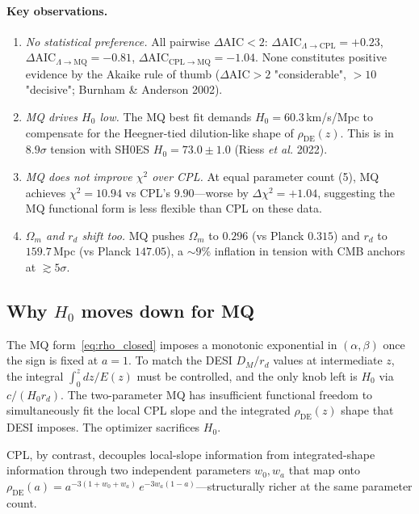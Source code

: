 \documentclass[11pt,letterpaper,twoside]{article}
\newcommand{\Om}{\Omega_{m}}
\newcommand{\rd}{r_{d}}
\newcommand{\DM}{D_{M}}
\newcommand{\rDE}{\rho_{\mathrm{DE}}}
\begin{document}
\paragraph{Key observations.}
\begin{enumerate}[leftmargin=*,topsep=0.1em,itemsep=0.1em]
\item \emph{No statistical preference.} All pairwise $\Delta\mathrm{AIC}<2$:
      $\Delta\mathrm{AIC}_{\Lambda\to\mathrm{CPL}}=+0.23$,
      $\Delta\mathrm{AIC}_{\Lambda\to\mathrm{MQ}}=-0.81$,
      $\Delta\mathrm{AIC}_{\mathrm{CPL}\to\mathrm{MQ}}=-1.04$.
      None constitutes positive evidence by the Akaike rule of thumb
      ($\Delta\mathrm{AIC}>2$ "considerable", $>10$ "decisive";
      Burnham \& Anderson 2002).
\item \emph{MQ drives $H_{0}$ low.} The MQ best fit demands
      $H_{0}=60.3$\,km/s/Mpc to compensate for the Heegner-tied dilution-like
      shape of $\rDE(z)$. This is in $8.9\sigma$ tension with SH0ES
      $H_{0}=73.0\pm1.0$ (Riess \emph{et al.} 2022).
\item \emph{MQ does not improve $\chi^{2}$ over CPL.} At equal parameter count
      (5), MQ achieves $\chi^{2}=10.94$ vs CPL's $9.90$---worse by
      $\Delta\chi^{2}=+1.04$, suggesting the MQ functional form is less
      flexible than CPL on these data.
\item \emph{$\Om$ and $\rd$ shift too.} MQ pushes $\Om$ to $0.296$ (vs Planck
      $0.315$) and $\rd$ to $159.7$\,Mpc (vs Planck $147.05$),
      a $\sim9\%$ inflation in tension with CMB anchors at $\gtrsim5\sigma$.
\end{enumerate}

\subsection{Why $H_{0}$ moves down for MQ}

The MQ form~\eqref{eq:rho_closed} imposes a monotonic exponential in
$(\alpha,\beta)$ once the sign is fixed at $a=1$. To match the DESI $\DM/\rd$
values at intermediate $z$, the integral $\int_{0}^{z}dz/E(z)$ must be
controlled, and the only knob left is $H_{0}$ via $c/(H_{0}\rd)$. The
two-parameter MQ has insufficient functional freedom to simultaneously fit
the local CPL slope and the integrated $\rDE(z)$ shape that DESI imposes.
The optimizer sacrifices $H_{0}$.

CPL, by contrast, decouples local-slope information from integrated-shape
information through two independent parameters $w_{0},w_{a}$ that map onto
$\rDE(a)=a^{-3(1+w_{0}+w_{a})}\,e^{-3w_{a}(1-a)}$---structurally richer at the
same parameter count.
\end{document}
